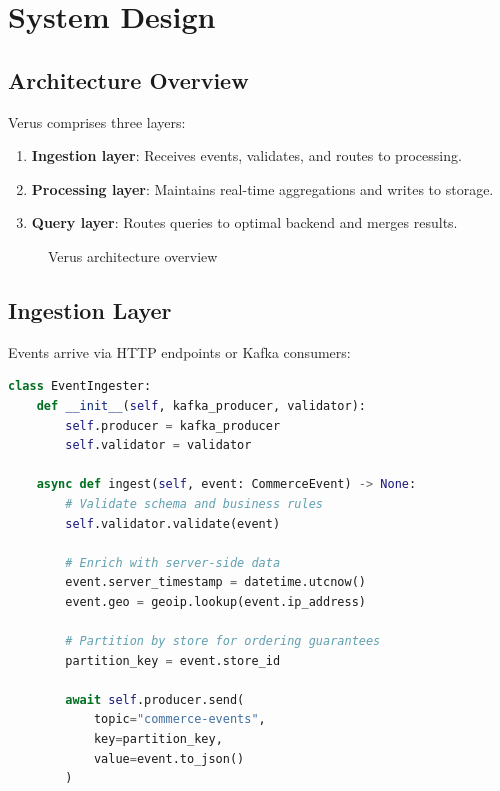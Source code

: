 \section{System Design}


\subsection{Architecture Overview}

Verus comprises three layers:

\begin{enumerate}
\item \textbf{Ingestion layer}: Receives events, validates, and routes to processing.
\item \textbf{Processing layer}: Maintains real-time aggregations and writes to storage.
\item \textbf{Query layer}: Routes queries to optimal backend and merges results.
\end{enumerate}

\begin{figure}[h]
\centering
{}
\caption{Verus architecture overview}
\label{fig:arch}
\end{figure}

\subsection{Ingestion Layer}

Events arrive via HTTP endpoints or Kafka consumers:

\begin{lstlisting}[language=Python,caption=Event ingestion]
class EventIngester:
    def __init__(self, kafka_producer, validator):
        self.producer = kafka_producer
        self.validator = validator

    async def ingest(self, event: CommerceEvent) -> None:
        # Validate schema and business rules
        self.validator.validate(event)

        # Enrich with server-side data
        event.server_timestamp = datetime.utcnow()
        event.geo = geoip.lookup(event.ip_address)

        # Partition by store for ordering guarantees
        partition_key = event.store_id

        await self.producer.send(
            topic="commerce-events",
            key=partition_key,
            value=event.to_json()
        )
\end{lstlisting}

